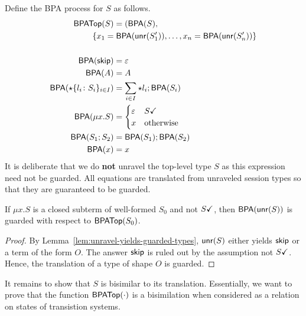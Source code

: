 Define the BPA process for $S$ as follows.
% 
\begin{align*}
  \mathsf{BPATop} (S) &= (\mathsf{BPA} (S), \\
   \{ x_1=&\; \mathsf{BPA} (\mathsf{unr} (S_1')), \dots, x_n = \mathsf{BPA} (\mathsf{unr} (S_n')) \}
  \\
  \\
  \mathsf{BPA} (\mathsf{skip}) &= \varepsilon \\
  \mathsf{BPA} (A) &= A\\
  \mathsf{BPA} (\star\{l_i\colon S_i\}_{i\in I}) &= \sum _{i\in I} \star l_i; \mathsf{BPA} (S_i)\\
  \mathsf{BPA} (\mu x.S) &=
                    \begin{cases}
                      \varepsilon & S \checkmark
                      \\
                      x & \text{otherwise}
                    \end{cases}
                   \\
  \mathsf{BPA} (S_1;S_2) &= \mathsf{BPA} (S_1) ; \mathsf{BPA} (S_2) \\
  \mathsf{BPA} (x) &= x
\end{align*}
It is deliberate that we do \textbf{not} unravel the top-level type $S$ as this expression need not
be guarded. All equations are translated from unraveled session types so that they are guaranteed to
be guarded.


\begin{lemma}
  If $\mu x.S$ is a closed subterm of well-formed $S_0$ and not
  $S \checkmark$, then $\mathsf{BPA} (\mathsf{unr} (S))$ is guarded with respect to
  $\mathsf{BPATop} (S_0)$.
\end{lemma}
%
\begin{proof}
  By Lemma~\ref{lem:unravel-yields-guarded-types}, $\mathsf{unr} (S)$
  either yields $\mathsf{skip}$ or a term of the form $O$. The answer
  $\mathsf{skip}$ is ruled out by the assumption not $S \checkmark$. Hence, the
  translation of a type of shape $O$ is guarded.
\end{proof}

It remains to show that $S$ is bisimilar to its
translation. Essentially, we want to prove that the function
$\mathsf{BPATop} (\cdot)$ is a bisimilation when considered as a relation on states of transistion systems.

